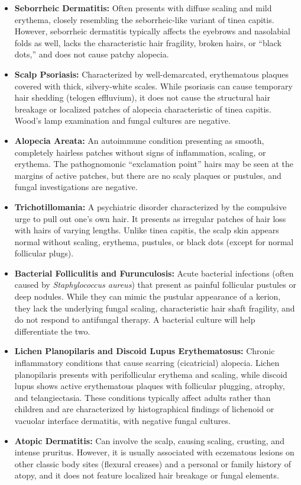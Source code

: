 \begin{itemize}
    \item \textbf{Seborrheic Dermatitis:} Often presents with diffuse scaling and mild erythema, closely resembling the seborrheic-like variant of tinea capitis. However, seborrheic dermatitis typically affects the eyebrows and nasolabial folds as well, lacks the characteristic hair fragility, broken hairs, or ``black dots,'' and does not cause patchy alopecia.
    \item \textbf{Scalp Psoriasis:} Characterized by well-demarcated, erythematous plaques covered with thick, silvery-white scales. While psoriasis can cause temporary hair shedding (telogen effluvium), it does not cause the structural hair breakage or localized patches of alopecia characteristic of tinea capitis. Wood's lamp examination and fungal cultures are negative.
    \item \textbf{Alopecia Areata:} An autoimmune condition presenting as smooth, completely hairless patches without signs of inflammation, scaling, or erythema. The pathognomonic ``exclamation point'' hairs may be seen at the margins of active patches, but there are no scaly plaques or pustules, and fungal investigations are negative.
    \item \textbf{Trichotillomania:} A psychiatric disorder characterized by the compulsive urge to pull out one's own hair. It presents as irregular patches of hair loss with hairs of varying lengths. Unlike tinea capitis, the scalp skin appears normal without scaling, erythema, pustules, or black dots (except for normal follicular plugs).
    \item \textbf{Bacterial Folliculitis and Furunculosis:} Acute bacterial infections (often caused by \textit{Staphylococcus aureus}) that present as painful follicular pustules or deep nodules. While they can mimic the pustular appearance of a kerion, they lack the underlying fungal scaling, characteristic hair shaft fragility, and do not respond to antifungal therapy. A bacterial culture will help differentiate the two.
    \item \textbf{Lichen Planopilaris and Discoid Lupus Erythematosus:} Chronic inflammatory conditions that cause scarring (cicatricial) alopecia. Lichen planopilaris presents with perifollicular erythema and scaling, while discoid lupus shows active erythematous plaques with follicular plugging, atrophy, and telangiectasia. These conditions typically affect adults rather than children and are characterized by histographical findings of lichenoid or vacuolar interface dermatitis, with negative fungal cultures.
    \item \textbf{Atopic Dermatitis:} Can involve the scalp, causing scaling, crusting, and intense pruritus. However, it is usually associated with eczematous lesions on other classic body sites (flexural creases) and a personal or family history of atopy, and it does not feature localized hair breakage or fungal elements.
\end{itemize}

